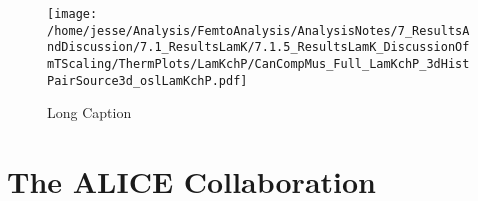 \documentclass[ALICE,manyauthors]{cernphprep}
\begin{document}
\begin{figure}[h]
  \centering
  \texttt{[image: /home/jesse/Analysis/FemtoAnalysis/AnalysisNotes/7\_ResultsAndDiscussion/7.1\_ResultsLamK/7.1.5\_ResultsLamK\_DiscussionOfmTScaling/ThermPlots/LamKchP/CanCompMus\_Full\_LamKchP\_3dHistPairSource3d\_oslLamKchP.pdf]}
  \caption[Short Caption]{Long Caption}
  \label{fig:LamKchP_ThermSources_VaryMuOut}
\end{figure}




\section{The ALICE Collaboration}
\label{app:collab}
\end{document}
